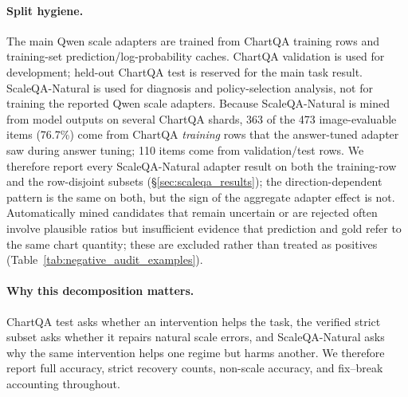 \paragraph{Split hygiene.}
The main Qwen scale adapters are trained from ChartQA training rows and training-set prediction/log-probability caches. ChartQA validation is used for development; held-out ChartQA test is reserved for the main task result. ScaleQA-Natural is used for diagnosis and policy-selection analysis, not for training the reported Qwen scale adapters. Because ScaleQA-Natural is mined from model outputs on several ChartQA shards, 363 of the 473 image-evaluable items (76.7\%) come from ChartQA \emph{training} rows that the answer-tuned adapter saw during answer tuning; 110 items come from validation/test rows. \verify{[State whether any of these 363 rows are among the $K=300$ scale-pair training rows.]} We therefore report every ScaleQA-Natural adapter result on both the training-row and the row-disjoint subsets (\S\ref{sec:scaleqa_results}); the direction-dependent pattern is the same on both, but the sign of the aggregate adapter effect is not. Automatically mined candidates that remain uncertain or are rejected often involve plausible ratios but insufficient evidence that prediction and gold refer to the same chart quantity; these are excluded rather than treated as positives (Table~\ref{tab:negative_audit_examples}).

\paragraph{Why this decomposition matters.}
ChartQA test asks whether an intervention helps the task, the verified strict subset asks whether it repairs natural scale errors, and ScaleQA-Natural asks why the same intervention helps one regime but harms another. We therefore report full accuracy, strict recovery counts, non-scale accuracy, and fix--break accounting throughout.
